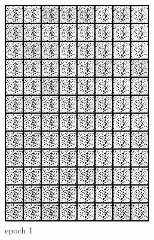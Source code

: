 \documentclass[a4paper]{article}
\theoremstyle{definition}
\begin{document}
\begin{enumerate} [label=(\alph*)]
		\begin{figure}[H]
			\centering
			\begin{subfigure}[b]{0.3\textwidth}
				\centering
				\includegraphics[width=\textwidth]{gan_q1b_epoch1.png}
				\caption{epoch 1}
			\end{subfigure}
			\hfill
			\begin{subfigure}[b]{0.3\textwidth}
				\centering

\end{subfigure}
\end{figure}
\end{enumerate}
\end{document}
